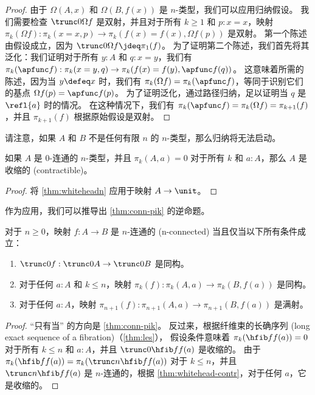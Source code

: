 {\begin{proof}
  由于 $\Omega(A,x)$ 和 $\Omega(B,f(x))$ 是 $n$-类型，我们可以应用归纳假设。
  我们需要检查 $\trunc 0{\Omega f}$ 是双射，并且对于所有 $k\geq1$ 和 $p : x = x$，映射 $\pi_k(\Omega f):\pi_k(x = x,p) \to \pi_k(f(x) = f(x),\Omega f(p))$ 是双射。
  第一个陈述由假设成立，因为 $\trunc 0{\Omega f} \jdeq \pi_1(f)$。
  为了证明第二个陈述，我们首先将其泛化：我们证明对于所有 $y : A$ 和 $q : x = y$，我们有 $\pi_k(\apfunc f):\pi_k(x = y,q) \to \pi_k(f(x) = f(y),\apfunc f(q))$。
  这意味着所需的陈述，因为当 $y\defeq x$ 时，我们有 $\pi_k(\Omega f)=\pi_k(\apfunc f)$，等同于识别它们的基点 $\Omega f(p)=\apfunc f(p)$。
  为了证明泛化，通过路径归纳，足以证明当 $q$ 是 $\refl{a}$ 时的情况。
  在这种情况下，我们有 $\pi_k(\apfunc f) = \pi_k(\Omega f) = \pi_{k+1}(f)$，并且 $\pi_{k+1}(f)$ 根据原始假设是双射。
\end{proof}

请注意，如果 $A$ 和 $B$ 不是任何有限 $n$ 的 $n$-类型，那么归纳将无法启动。

\begin{cor}\label{thm:whitehead-contr}
如果 $A$ 是 $0$-连通的 $n$-类型，并且 $\pi_k(A,a)=0$ 对于所有 $k$ 和 $a:A$，那么 $A$ 是收缩的 (contractible)。
\end{cor}
\begin{proof}
  将 \cref{thm:whiteheadn} 应用于映射 $A\to\unit$。
\end{proof}

作为应用，我们可以推导出 \cref{thm:conn-pik} 的逆命题。

\begin{cor}\label{thm:pik-conn}
对于 $n\ge 0$，映射 $f:A\to B$ 是 $n$-连通的 (n-connected) 当且仅当以下所有条件成立：
\begin{enumerate}
  \item $\trunc0f:\trunc0A \to \trunc0B$ 是同构。
  \item 对于任何 $a:A$ 和 $k\le n$，映射 $\pi_k(f):\pi_k(A,a) \to \pi_k(B,f(a))$ 是同构。
  \item 对于任何 $a:A$，映射 $\pi_{n+1}(f):\pi_{n+1}(A,a) \to \pi_{n+1}(B,f(a))$ 是满射。
\end{enumerate}
\end{cor}
\begin{proof}
  ``只有当'' 的方向是 \cref{thm:conn-pik}。
  反过来，根据纤维束的长确序列 (long exact sequence of a fibration)（\cref{thm:les}），%
  假设条件意味着 $\pi_k(\hfib f {f(a)})=0$ 对于所有 $k\le n$ 和 $a:A$，并且 $\trunc 0{\hfib f{f(a)}}$ 是收缩的。
  由于 $\pi_k(\hfib f {f(a)}) = \pi_k(\trunc n{\hfib f{f(a)}})$ 对于 $k\le n$，并且 $\trunc n{\hfib f{f(a)}}$ 是 $n$-连通的，根据 \cref{thm:whitehead-contr}，对于任何 $a$，它是收缩的。


\end{proof}}
